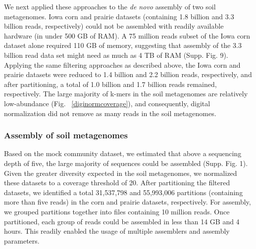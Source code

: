 \documentclass[11pt]{article} %
\begin{document}
We next applied these approaches to the {\em de novo} assembly of two
soil metagenomes.  Iowa corn and prairie datasets (containing 1.8
billion and 3.3 billion reads, respectively) could not be assembled
with readily available hardware (in under 500 GB of RAM).  A 75
million reads subset of the Iowa corn dataset alone required 110 GB of
memory, suggesting that assembly of the 3.3 billion read data set
might need as much as 4 TB of RAM (Supp. Fig. 9).  Applying the same
filtering approaches as described above, the Iowa corn and prairie
datasets were reduced to 1.4 billion and 2.2 billion reads,
respectively, and after partitioning, a total of 1.0 billion and 1.7
billion reads remained, respectively.  The large majority of k-mers in
the soil metagenomes are relatively low-abundance
(Fig. ~\ref{diginormcoverage}), and consequently, digital
normalization did not remove as many reads in the soil metagenomes.



\subsubsection{Assembly of soil metagenomes}

Based on the mock community dataset, we estimated that above a
sequencing depth of five, the large majority of sequences could be
assembled (Supp. Fig. 1).  Given the greater diversity expected in the
soil metagenomes, we normalized these datasets to a coverage threshold
of 20.  After partitioning the filtered datasets, we identified a
total 31,537,798 and 55,993,006 partitions (containing more than five
reads) in the corn and prairie datasets, respectively.  For assembly,
we grouped partitions together into files containing 10 million reads.
Once partitioned, each group of reads could be assembled in less than
14 GB and 4 hours.  This readily enabled the usage of multiple
assemblers and assembly parameters.
\end{document}
